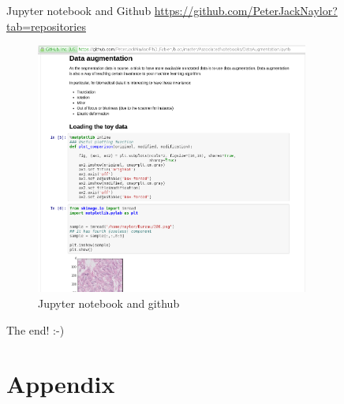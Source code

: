 \documentclass{beamer}
\begin{document}
\begin{frame}{Jupyter notebook and Github}
\url{https://github.com/PeterJackNaylor?tab=repositories}
\begin{figure}
\includegraphics[width=0.8\textwidth]{GitBook.png}
\caption{Jupyter notebook and github}
\end{figure}
\end{frame}


\begin{frame}[noframenumbering]
The end! :-)
\end{frame}
\section*{Appendix}
\end{document}
